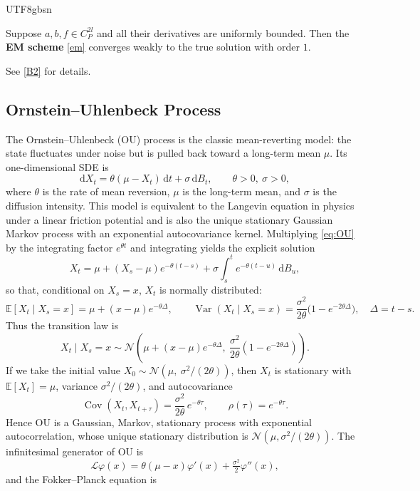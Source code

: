 \documentclass{article}
\begin{document}
\begin{CJK*}{UTF8}{gbsn}
\begin{theorem}
    Suppose $a,b,f\in C_P^{2l}$ and all their derivatives are uniformly bounded. Then the \textbf{EM scheme} \ref{em} converges weakly to the true solution with order $1$.
\end{theorem}
See \ref{B2} for details.

\subsection{Ornstein--Uhlenbeck Process}

The Ornstein--Uhlenbeck (OU) process is the classic mean-reverting model: the state fluctuates under noise but is pulled back toward a long-term mean $\mu$. Its one-dimensional SDE is
\begin{equation}\label{eq:OU}
  \mathrm{d}X_t=\theta(\mu-X_t)\,\mathrm{d}t+\sigma\,\mathrm{d}B_t,
  \qquad \theta>0,\ \sigma>0,
\end{equation}
where $\theta$ is the rate of mean reversion, $\mu$ is the long-term mean, and $\sigma$ is the diffusion intensity. This model is equivalent to the Langevin equation in physics under a linear friction potential and is also the unique stationary Gaussian Markov process with an exponential autocovariance kernel. Multiplying \eqref{eq:OU} by the integrating factor $e^{\theta t}$ and integrating yields the explicit solution
\[
  X_t=\mu + (X_s-\mu)e^{-\theta (t-s)}+\sigma\!\int_s^t e^{-\theta (t-u)}\,\mathrm{d}B_u,
\]
so that, conditional on $X_s=x$, $X_t$ is normally distributed:
\[
  \mathbb{E}[X_t\mid X_s=x] = \mu + (x-\mu)e^{-\theta\Delta},\qquad
  \operatorname{Var}(X_t\mid X_s=x) = \frac{\sigma^2}{2\theta}\bigl(1-e^{-2\theta\Delta}\bigr),\quad \Delta=t-s.
\]
Thus the transition law is
\[
  X_t\mid X_s=x \sim \mathcal{N}\!\left(\mu+(x-\mu)e^{-\theta\Delta},\ \frac{\sigma^2}{2\theta}(1-e^{-2\theta\Delta})\right).
\]
If we take the initial value $X_0\sim \mathcal{N}(\mu,\ \sigma^2/(2\theta))$, then $X_t$ is stationary with $\mathbb{E}[X_t]=\mu$, variance $\sigma^2/(2\theta)$, and autocovariance
\[
  \operatorname{Cov}(X_t,X_{t+\tau})=\frac{\sigma^2}{2\theta}\,e^{-\theta \tau},\qquad \rho(\tau)=e^{-\theta \tau}.
\]
Hence OU is a Gaussian, Markov, stationary process with exponential autocorrelation, whose unique stationary distribution is $\mathcal{N}(\mu,\sigma^2/(2\theta))$. The infinitesimal generator of OU is
\[
  \mathcal{L}\varphi(x)=\theta(\mu-x)\varphi'(x)+\tfrac{\sigma^2}{2}\varphi''(x),
\]
and the Fokker--Planck equation is

\end{CJK*}
\end{document}

